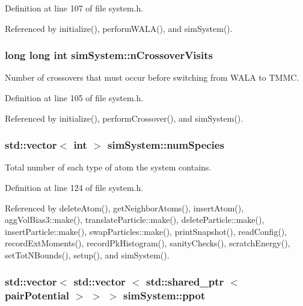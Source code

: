 Definition at line 107 of file system.\-h.



Referenced by initialize(), perform\-W\-A\-L\-A(), and sim\-System().

\hypertarget{classsim_system_aa748f651ddd9a2bf6d88bfcab9153905}{
\subsubsection[{n\-Crossover\-Visits}]{\setlength{\rightskip}{0pt plus 5cm}long long int sim\-System\-::n\-Crossover\-Visits}}\label{classsim_system_aa748f651ddd9a2bf6d88bfcab9153905}


Number of crossovers that must occur before switching from W\-A\-L\-A to T\-M\-M\-C. 



Definition at line 105 of file system.\-h.



Referenced by initialize(), perform\-Crossover(), and sim\-System().

\hypertarget{classsim_system_a9eea865e6dc1cff377b1e79c4d9c23f0}{
\subsubsection[{num\-Species}]{\setlength{\rightskip}{0pt plus 5cm}std\-::vector$<$ int $>$ sim\-System\-::num\-Species}}\label{classsim_system_a9eea865e6dc1cff377b1e79c4d9c23f0}


Total number of each type of atom the system contains. 



Definition at line 124 of file system.\-h.



Referenced by delete\-Atom(), get\-Neighbor\-Atoms(), insert\-Atom(), agg\-Vol\-Bias3\-::make(), translate\-Particle\-::make(), delete\-Particle\-::make(), insert\-Particle\-::make(), swap\-Particles\-::make(), print\-Snapshot(), read\-Config(), record\-Ext\-Moments(), record\-Pk\-Histogram(), sanity\-Checks(), scratch\-Energy(), set\-Tot\-N\-Bounds(), setup(), and sim\-System().

\hypertarget{classsim_system_ad2e290b5963f132e6a3a56cee35c8e9f}{
\subsubsection[{ppot}]{\setlength{\rightskip}{0pt plus 5cm}std\-::vector$<$ std\-::vector $<$ std\-::shared\-\_\-ptr $<$ {\bf pair\-Potential} $>$ $>$ $>$ sim\-System\-::ppot}}\label{classsim_system_ad2e290b5963f132e6a3a56cee35c8e9f}



